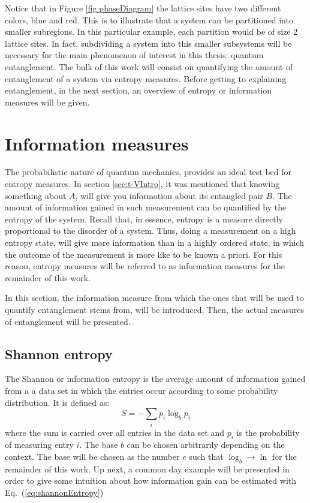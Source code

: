 Notice that in Figure \ref{fig:phaseDiagram} the lattice sites have two different colors, blue and red. This is to illustrate that a system can be partitioned into smaller subregions. In this particular example, each partition would be of size 2 lattice sites. In fact, subdividing a system into this smaller subsystems will be necessary for the main phenomenon of interest in this thesis: quantum entanglement. The bulk of this work will consist on quantifying the amount of entanglement of a system via entropy measures. Before getting to explaining entanglement, in the next section, an overview of entropy or information measures will be given.

\section{Information measures}
\label{sec:informationMeasures}

	The probabilistic nature of quantum mechanics, provides an ideal test bed for entropy measures. In section \ref{sec:t-VIntro}, it was mentioned that knowing something about $A$, will give you information about its entangled pair $B$. The amount of information gained in such measurement can be quantified by the entropy of the system. Recall that, in essence, entropy is a measure directly proportional to the disorder of a system. Thus, doing a measurement on a high entropy state, will give more information than in a highly ordered state, in which the outcome of the measurement is more like to be known a priori. For this reason, entropy measures will be referred to as information measures for the remainder of this work.
	
	In this section, the information measure from which the ones that will be used to quantify entanglement stems from, will be introduced. Then, the actual measures of entanglement will be presented.
	
	\subsection{Shannon entropy}
	
	The Shannon or information entropy is the average amount of information gained from a a data set in which the entries occur according to some probability distribution. It is defined as:
	\begin{equation}
	S = -\sum_{i} p_i \log_{b} p_i
	\label{eq:shannonEntropy}
	\end{equation}
	where the sum is carried over all entries in the data set and $p_i$ is the probability of measuring entry $i$. The base $b$ can be chosen arbitrarily depending on the context. The base will be chosen as the number $e$ such that $\log_b \to \ln$ for the remainder of this work. Up next, a common day example will be presented in order to give some intuition about how information gain can be estimated with Eq.~(\ref{eq:shannonEntropy})
	
